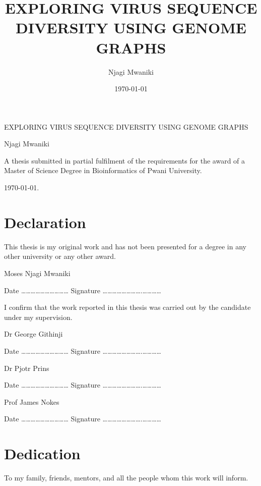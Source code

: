 \documentclass[10pt, a4paper]{article}
\author{Njagi Mwaniki}
\date{\today}
\title{EXPLORING VIRUS SEQUENCE DIVERSITY USING GENOME GRAPHS}
\begin{document}
\begin{titlepage}
\centering
{\LARGE EXPLORING VIRUS SEQUENCE DIVERSITY USING GENOME GRAPHS \par }
\vspace {8cm}
{\small Njagi Mwaniki \par}
\vspace {8cm} 
{\small A thesis submitted in partial fulfilment of the             requirements for the award of a Master of Science Degree in             Bioinformatics of Pwani University. \par}
\vspace {1mm} 
{\small \today. \par}
\end{titlepage}
\newcommand{\bigO}{\mathcal{O}}


\setcounter{secnumdepth}{0}
\newpage

\section{Declaration}
\label{sec:orgc1542c3}
This thesis is my original work and has not been presented for a degree in any other university or any other award.

\vspace{10mm}

Moses Njagi Mwaniki

Date …………………………    Signature …………………….…………

\vspace{20mm}
I confirm that the work reported in this thesis was carried out by the candidate under my supervision.

\vspace{10mm}

Dr George Githinji

Date …………………………    Signature …………………….…………

\vspace{10mm}

Dr Pjotr Prins

Date …………………………    Signature …………………….…………

\vspace{10mm}

Prof James Nokes

Date …………………………    Signature …………………….…………


\newpage

\section{Dedication}
\label{sec:org3782075}
To my family, friends, mentors, and all the people whom this work will inform.
\end{document}
